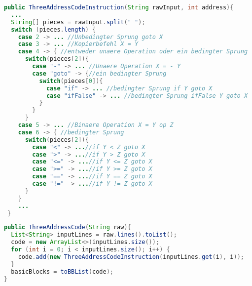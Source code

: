 \begin{lstlisting}[language=java, caption={Konstruktor der Klasse ThreeAddressCodeInstruction}, label={cde:taci-constructor}]
public ThreeAddressCodeInstruction(String rawInput, int address){
  ...
  String[] pieces = rawInput.split(" ");
  switch (pieces.length) {
    case 2 -> ... //Unbedingter Sprung goto X
    case 3 -> ... //Kopierbefehl X = Y
    case 4 -> { //entweder unaere Operation oder ein bedingter Sprung
      switch(pieces[2]){
        case "-" -> ... //Unaere Operation X = - Y
        case "goto" -> {//ein bedingter Sprung
          switch(pieces[0]){
            case "if" -> ... //bedingter Sprung if Y goto X
            case "ifFalse" -> ... //bedingter Sprung ifFalse Y goto X
          }
        }
      }
    case 5 -> ... //Binaere Operation X = Y op Z
    case 6 -> { //bedingter Sprung
      switch(pieces[2]){
        case "<" -> ...//if Y < Z goto X
        case ">" -> ...//if Y > Z goto X
        case "<=" -> ...//if Y <= Z goto X
        case ">=" -> ...//if Y >= Z goto X
        case "==" -> ...//if Y == Z goto X
        case "!=" -> ...//if Y != Z goto X
      }
    }
    ...
 }
\end{lstlisting}

\begin{lstlisting}[language=Java, caption={Der Konstruktor der ThreeAddressCode Klasse}, label={cde:tac-constructor}]
public ThreeAddressCode(String raw){
  List<String> inputLines = raw.lines().toList();
  code = new ArrayList<>(inputLines.size());
  for (int i = 0; i < inputLines.size(); i++) {
    code.add(new ThreeAddressCodeInstruction(inputLines.get(i), i));
  }
  basicBlocks = toBBList(code);
}
\end{lstlisting}

